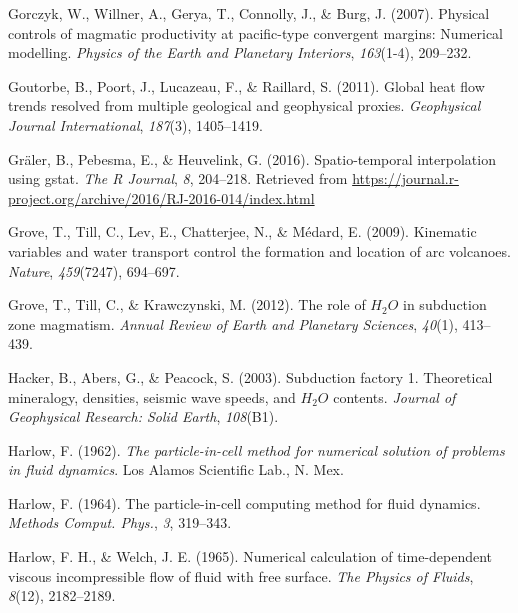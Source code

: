 \begin{CSLReferences}{1}{1}
\leavevmode{}%
Gorczyk, W., Willner, A., Gerya, T., Connolly, J., \& Burg, J. (2007). Physical controls of magmatic productivity at pacific-type convergent margins: Numerical modelling. \emph{Physics of the Earth and Planetary Interiors}, \emph{163}(1-4), 209--232.

\leavevmode{}%
Goutorbe, B., Poort, J., Lucazeau, F., \& Raillard, S. (2011). Global heat flow trends resolved from multiple geological and geophysical proxies. \emph{Geophysical Journal International}, \emph{187}(3), 1405--1419.

\leavevmode{}%
Gräler, B., Pebesma, E., \& Heuvelink, G. (2016). Spatio-temporal interpolation using gstat. \emph{The R Journal}, \emph{8}, 204--218. Retrieved from \url{https://journal.r-project.org/archive/2016/RJ-2016-014/index.html}

\leavevmode{}%
Grove, T., Till, C., Lev, E., Chatterjee, N., \& Médard, E. (2009). Kinematic variables and water transport control the formation and location of arc volcanoes. \emph{Nature}, \emph{459}(7247), 694--697.

\leavevmode{}%
Grove, T., Till, C., \& Krawczynski, M. (2012). The role of \(H_2O\) in subduction zone magmatism. \emph{Annual Review of Earth and Planetary Sciences}, \emph{40}(1), 413--439.

\leavevmode{}%
Hacker, B., Abers, G., \& Peacock, S. (2003). Subduction factory 1. Theoretical mineralogy, densities, seismic wave speeds, and \(H_2O\) contents. \emph{Journal of Geophysical Research: Solid Earth}, \emph{108}(B1).

\leavevmode{}%
Harlow, F. (1962). \emph{The particle-in-cell method for numerical solution of problems in fluid dynamics}. Los Alamos Scientific Lab., N. Mex.

\leavevmode{}%
Harlow, F. (1964). The particle-in-cell computing method for fluid dynamics. \emph{Methods Comput. Phys.}, \emph{3}, 319--343.

\leavevmode{}%
Harlow, F. H., \& Welch, J. E. (1965). Numerical calculation of time-dependent viscous incompressible flow of fluid with free surface. \emph{The Physics of Fluids}, \emph{8}(12), 2182--2189.


\end{CSLReferences}
